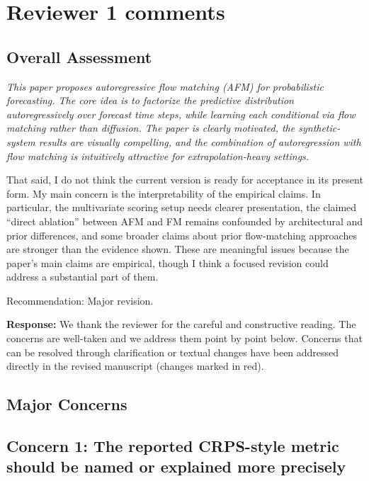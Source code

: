 \documentclass[11pt]{article}
\newcommand{\reviewertext}[1]{%
  \begin{reviewerquote}
    {\color{reviewercolor}\itshape #1}
  \end{reviewerquote}%
}
\newcommand{\authorresponse}[1]{%
  \textbf{Response:} #1\par\medskip
}
\begin{document}
\section{Reviewer 1 comments}

\subsection{Overall Assessment}

\reviewertext{%
This paper proposes autoregressive flow matching (AFM) for probabilistic forecasting. The core idea is to factorize the predictive distribution autoregressively over forecast time steps, while learning each conditional via flow matching rather than diffusion. The paper is clearly motivated, the synthetic-system results are visually compelling, and the combination of autoregression with flow matching is intuitively attractive for extrapolation-heavy settings.

That said, I do not think the current version is ready for acceptance in its present form. My main concern is the interpretability of the empirical claims. In particular, the multivariate scoring setup needs clearer presentation, the claimed ``direct ablation'' between AFM and FM remains confounded by architectural and prior differences, and some broader claims about prior flow-matching approaches are stronger than the evidence shown. These are meaningful issues because the paper's main claims are empirical, though I think a focused revision could address a substantial part of them.

Recommendation: Major revision.
}

\authorresponse{%
We thank the reviewer for the careful and constructive reading. The concerns are well-taken and we address them point by point below. Concerns that can be resolved through clarification or textual changes have been addressed directly in the revised manuscript (changes marked in red).
}

\subsection{Major Concerns}

\subsection{Concern 1: The reported CRPS-style metric should be named or explained more precisely}
\end{document}
